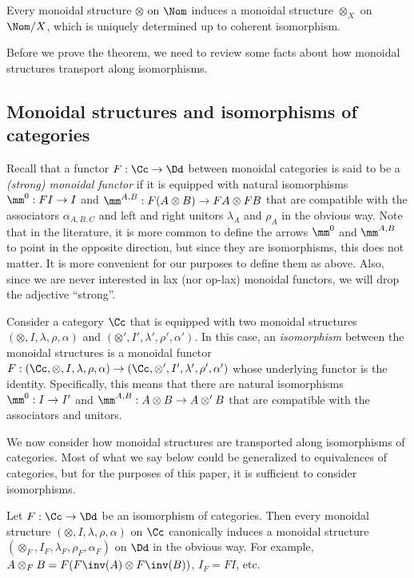 \documentclass[twoside,11pt]{entics}
\begin{document}
\begin{xtheorem}\label{thm:monoidal-nom-slash-x}
    Every monoidal structure $\otimes$ on $\Nom$ induces a
    monoidal structure $\otimes_X$ on $\Nom/X$, which is uniquely determined up to coherent isomorphism.
\end{xtheorem}

Before we prove the theorem, we need to review some facts about how
monoidal structures transport along isomorphisms.

\subsection{Monoidal structures and isomorphisms of categories}
\label{ssec:monoidal-iso-cats}

Recall that a functor $F:\Cc\to\Dd$ between monoidal categories is
said to be a {\em (strong) monoidal functor} if it is equipped with
natural isomorphisms $\mm^0 : FI\to I$ and $\mm^{A,B}:F(A\otimes B)\to
FA\otimes FB$ that are compatible with the associators $\alpha_{A,B,C}$ and left and right unitors
$\lambda_A$ and $\rho_A$ in
the obvious way. Note that in the literature, it is more common to
define the arrows $\mm^0$ and $\mm^{A,B}$ to point in the opposite
direction, but since they are isomorphisms, this does not matter. It
is more convenient for our purposes to define them as above. Also,
since we are never interested in lax (nor op-lax) monoidal functors,
we will drop the adjective ``strong''.

Consider a category $\Cc$ that is equipped with two monoidal
structures $(\otimes,I,\lambda,\rho,\alpha)$ and
$(\otimes',I',\lambda',\rho',\alpha')$. In this case, an
\emph{isomorphism} between the monoidal structures is a monoidal
functor $F:(\Cc,\otimes,I,\lambda,\rho,\alpha) \to
(\Cc,\otimes',I',\lambda',\rho',\alpha')$ whose underlying functor is
the identity. Specifically, this means that there are natural
isomorphisms $\mm^0 : I\to I'$ and $\mm^{A,B}:A\otimes B\to
A\otimes' B$ that are compatible with the associators and unitors.

We now consider how monoidal structures are transported along
isomorphisms of categories. Most of what we say below could be
generalized to equivalences of categories, but for the purposes of
this paper, it is sufficient to consider isomorphisms.

Let $F:\Cc\to\Dd$ be an isomorphism of categories. Then every monoidal
structure $(\otimes,I,\lambda,\rho,\alpha)$ on $\Cc$ canonically
induces a monoidal structure
$(\otimes_F,I_F,\lambda_F,\rho_F,\alpha_F)$ on $\Dd$ in the obvious
way. For example, $A\otimes_F B = F(F\inv(A)\otimes F\inv(B))$, $I_F =
FI$, etc.
\end{document}
